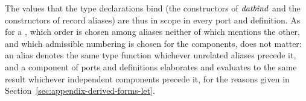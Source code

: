 The values that the type declarations bind (the constructors of $\mathit{datbind}$
and the constructors of record aliases) are thus in scope in every port and
definition. As for a , which order is chosen among aliases neither of
which mentions the other, and which admissible numbering is chosen for the
components, does not matter: an alias denotes the same type function
whichever unrelated aliases precede it, and a component of ports and
definitions elaborates and evaluates to the same result whichever independent
components precede it, for the reasons given in
Section~\ref{sec:appendix-derived-forms-let}. %

